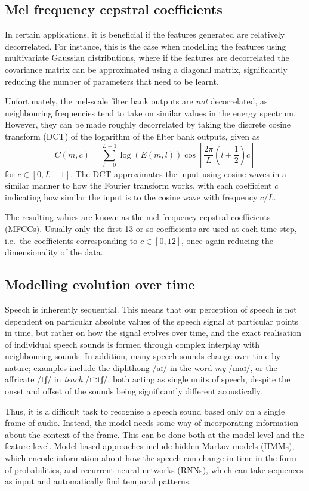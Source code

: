 \subsection{Mel frequency cepstral coefficients}

In certain applications, it is beneficial if the features generated are relatively decorrelated.
For instance, this is the case when modelling the features using multivariate Gaussian distributions, where if the features are decorrelated the covariance matrix can be approximated using a diagonal matrix, significantly reducing the number of parameters that need to be learnt.

Unfortunately, the mel-scale filter bank outputs are \emph{not} decorrelated, as neighbouring frequencies tend to take on similar values in the energy spectrum.
However, they can be made roughly decorrelated by taking the discrete cosine transform (DCT) of the logarithm of the filter bank outputs, given as
\[
C(m,c) = \sum_{l=0}^{L-1} \log(E(m,l)) \cos\left[\frac{2\pi}{L}\left(l+\frac{1}{2}\right)c\right]
\]
for $c \in [0, L - 1]$.
The DCT approximates the input using cosine waves in a similar manner to how the Fourier transform works, with each coefficient $c$ indicating how similar the input is to the cosine wave with frequency $c/L$.

The resulting values are known as the mel-frequency cepstral coefficients (MFCCs).
Usually only the first 13 or so coefficients are used at each time step, i.e.\ the coefficients corresponding to $c \in [0, 12]$, once again reducing the dimensionality of the data.

\subsection{Modelling evolution over time}

Speech is inherently sequential.
This means that our perception of speech is not dependent on particular absolute values of the speech signal at particular points in time, but rather on how the signal evolves over time, and the exact realisation of individual speech sounds is formed through complex interplay with neighbouring sounds.
In addition, many speech sounds change over time by nature; examples include the diphthong /aɪ/ in the word \emph{my} /maɪ/, or the affricate /tʃ/ in \emph{teach} /tiːtʃ/, both acting as single units of speech, despite the onset and offset of the sounds being significantly different acoustically.

Thus, it is a difficult task to recognise a speech sound based only on a single frame of audio.
Instead, the model needs some way of incorporating information about the context of the frame.
This can be done both at the model level and the feature level.
Model-based approaches include hidden Markov models (HMMs), which encode information about how the speech can change in time in the form of probabilities, and recurrent neural networks (RNNs), which can take sequences as input and automatically find temporal patterns.

